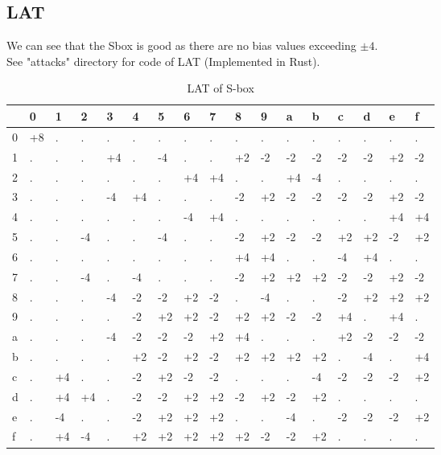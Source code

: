 \documentclass[final]{transcrypto}
\begin{document}
\subsection{LAT}
We can see that the Sbox is good as there are no bias values exceeding $\pm 4$.\\
See "attacks" directory for code of LAT (Implemented in Rust).
\begin{table}[H]
	\centering
	\caption{LAT of S-box}
	\begin{tabular}{|l||l|l|l|l|l|l|l|l|l|l|l|l|l|l|l|l|}
		\hline
&0&1&2&3&4&5&6&7&8&9&a&b&c&d&e&f\\ \hline
\hline
0&+8&.&.&.&.&.&.&.&.&.&.&.&.&.&.&.\\ \hline
1&.&.&.&+4&.&-4&.&.&+2&-2&-2&-2&-2&-2&+2&-2\\ \hline
2&.&.&.&.&.&.&+4&+4&.&.&+4&-4&.&.&.&.\\ \hline
3&.&.&.&-4&+4&.&.&.&-2&+2&-2&-2&-2&-2&+2&-2\\ \hline
4&.&.&.&.&.&.&-4&+4&.&.&.&.&.&.&+4&+4\\ \hline
5&.&.&-4&.&.&-4&.&.&-2&+2&-2&-2&+2&+2&-2&+2\\ \hline
6&.&.&.&.&.&.&.&.&+4&+4&.&.&-4&+4&.&.\\ \hline
7&.&.&-4&.&-4&.&.&.&-2&+2&+2&+2&-2&-2&+2&-2\\ \hline
8&.&.&.&-4&-2&-2&+2&-2&.&-4&.&.&-2&+2&+2&+2\\ \hline
9&.&.&.&.&-2&+2&+2&-2&+2&+2&-2&-2&+4&.&+4&.\\ \hline
a&.&.&.&-4&-2&-2&-2&+2&+4&.&.&.&+2&-2&-2&-2\\ \hline
b&.&.&.&.&+2&-2&+2&-2&+2&+2&+2&+2&.&-4&.&+4\\ \hline
c&.&+4&.&.&-2&+2&-2&-2&.&.&.&-4&-2&-2&-2&+2\\ \hline
d&.&+4&+4&.&-2&-2&+2&+2&-2&+2&-2&+2&.&.&.&.\\ \hline
e&.&-4&.&.&-2&+2&+2&+2&.&.&-4&.&-2&-2&-2&+2\\ \hline
f&.&+4&-4&.&+2&+2&+2&+2&+2&-2&-2&+2&.&.&.&.\\ \hline
	\end{tabular}
\end{table}
\end{document}
